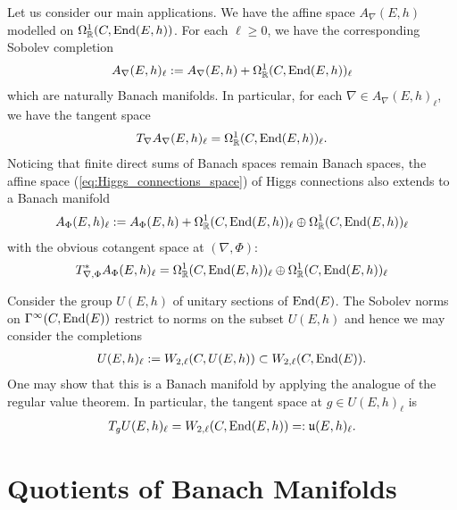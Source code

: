 \documentclass[12pt]{ociamthesis}  %
\begin{document}
\begin{example}
  Let us consider our main applications. We have the affine space
  $A_\nabla(E,h)$ modelled on $\Omega^1_{\mathbb{R}}(C,\operatorname{End}(E,h))$.
  For each $\ell \geq 0$, we have the corresponding Sobolev completion
  \begin{align*}
    A_\nabla(E,h)_\ell := A_\nabla(E,h) + \Omega^1_{\mathbb{R}}(C,\operatorname{End}(E,h))_\ell
  \end{align*}
  which are naturally Banach manifolds.
  In particular, for each $\nabla\in A_\nabla(E,h)_\ell$, we have the
  tangent space
  \begin{align*}
    T_\nabla A_\nabla(E,h)_\ell
    = \Omega^1_{\mathbb{R}}(C,\operatorname{End}(E,h))_\ell.
  \end{align*}
  Noticing that finite direct sums of Banach spaces remain Banach spaces,
  the affine space (\ref{eq:Higgs_connections_space}) of Higgs connections also
  extends to a Banach manifold
  \begin{align*}
    A_\Phi(E,h)_\ell := A_\Phi(E,h) + \Omega^1_{\mathbb{R}}(C,\operatorname{End}(E,h))_\ell
    \oplus \Omega^1_{\mathbb{R}}(C,\operatorname{End}(E,h))_\ell
  \end{align*}
  with the obvious cotangent space at $(\nabla,\Phi)$:
  \begin{align*}
    T^*_{\nabla,\Phi} A_\Phi(E,h)_\ell
    = \Omega^1_{\mathbb{R}}(C,\operatorname{End}(E,h))_\ell
    \oplus \Omega^1_{\mathbb{R}}(C,\operatorname{End}(E,h))_\ell
  \end{align*}
\end{example}

\begin{example}
  Consider the group $U(E,h)$ of unitary
  sections of $\operatorname{End}(E)$. The Sobolev norms on $\Gamma^\infty(C,\operatorname{End}(E))$
  restrict to norms on the subset $U(E,h)$ and hence we
  may consider the completions
  \begin{align*}
    U(E,h)_\ell := W_{2,\ell}(C,U(E,h)) \subset W_{2,\ell}(C,\operatorname{End}(E)).
  \end{align*}
  One may show that this is a Banach manifold by applying the
  analogue of the regular value theorem. In particular,
  the tangent space at $g\in U(E,h)_\ell$ is
  \begin{align*}
    T_g U(E,h)_\ell = W_{2,\ell}(C,\operatorname{End}(E,h)) =: \mathfrak u(E,h)_\ell.
  \end{align*}
\end{example}

\section{Quotients of Banach Manifolds}
\end{document}
